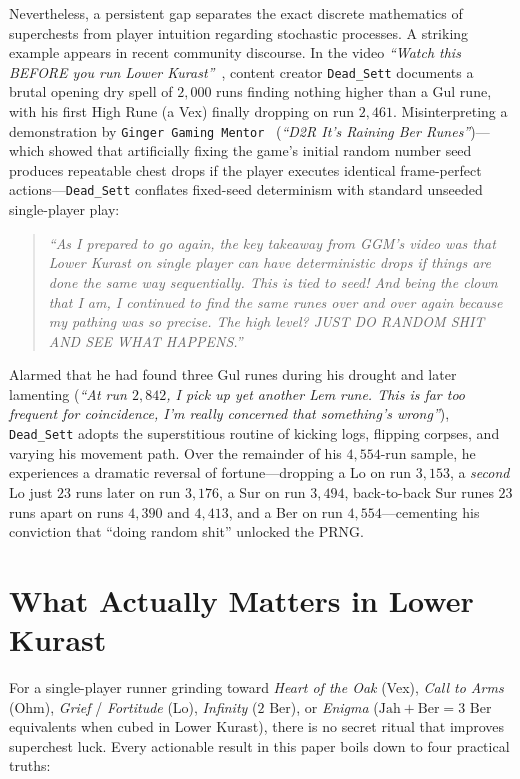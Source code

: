 \documentclass[11pt,reqno]{amsart}
\theoremstyle{definition}
\begin{document}
Nevertheless, a persistent gap separates the exact discrete mathematics of superchests from player intuition regarding stochastic processes. A striking example appears in recent community discourse. In the video \emph{``Watch this BEFORE you run Lower Kurast''}~\cite{deadsett2024}, content creator \texttt{Dead\_Sett} documents a brutal opening dry spell of $2{,}000$ runs finding nothing higher than a Gul rune, with his first High Rune (a Vex) finally dropping on run $2{,}461$. Misinterpreting a demonstration by \texttt{Ginger Gaming Mentor}~\cite{ggm2023} (\emph{``D2R It's Raining Ber Runes''})—which showed that artificially fixing the game's initial random number seed produces repeatable chest drops if the player executes identical frame-perfect actions—\texttt{Dead\_Sett} conflates fixed-seed determinism with standard unseeded single-player play:
\begin{quote}
\emph{``As I prepared to go again, the key takeaway from GGM's video was that Lower Kurast on single player can have deterministic drops if things are done the same way sequentially. This is tied to seed! And being the clown that I am, I continued to find the same runes over and over again because my pathing was so precise. The high level? JUST DO RANDOM SHIT AND SEE WHAT HAPPENS.''}
\end{quote}
Alarmed that he had found three Gul runes during his drought and later lamenting (\emph{``At run $2{,}842$, I pick up yet another Lem rune. This is far too frequent for coincidence, I'm really concerned that something's wrong''}), \texttt{Dead\_Sett} adopts the superstitious routine of kicking logs, flipping corpses, and varying his movement path. Over the remainder of his $4{,}554$-run sample, he experiences a dramatic reversal of fortune—dropping a Lo on run $3{,}153$, a \emph{second} Lo just $23$ runs later on run $3{,}176$, a Sur on run $3{,}494$, back-to-back Sur runes $23$ runs apart on runs $4{,}390$ and $4{,}413$, and a Ber on run $4{,}554$—cementing his conviction that ``doing random shit'' unlocked the PRNG.

\section{What Actually Matters in Lower Kurast}
\label{sec:bluf}

For a single-player runner grinding toward \emph{Heart of the Oak} (Vex), \emph{Call to Arms} (Ohm), \emph{Grief} / \emph{Fortitude} (Lo), \emph{Infinity} ($2\text{ Ber}$), or \emph{Enigma} ($\text{Jah} + \text{Ber} = 3\text{ Ber}$ equivalents when cubed in Lower Kurast), there is no secret ritual that improves superchest luck. Every actionable result in this paper boils down to four practical truths:
\end{document}
